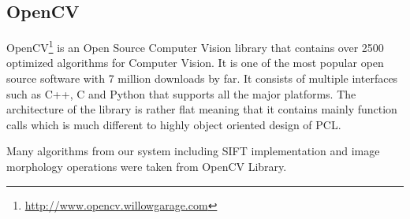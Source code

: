 \subsection{OpenCV}
OpenCV\footnote{\url{http://www.opencv.willowgarage.com}} is an Open Source Computer Vision library that contains over 2500 optimized algorithms for Computer Vision. It is one of the most popular open source software with 7 million downloads by far. It consists of multiple interfaces such as C++, C and Python that supports all the major platforms. The architecture of the library is rather flat meaning that it contains mainly function calls which is much different to highly object oriented design of PCL.

Many algorithms from our system including SIFT implementation and image morphology operations were taken from OpenCV Library. 








